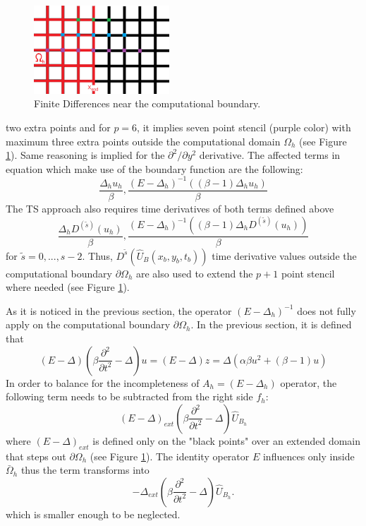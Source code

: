 \documentclass[11pt,a4paper,twoside]{article}
\begin{document}
\begin{figure}[ht]%
\begin{center}
\includegraphics[width=2in]{Pictures/BoundaryPicture.png}
	\caption{Finite Differences near the computational boundary.}
	\label{fig:BoundaryFD}
  \end{center}
\end{figure}
two extra points and for $p=6$, it implies seven point stencil (purple color) with maximum three extra points outside the computational domain $\Omega_h$ (see Figure \ref{fig:BoundaryFD}). Same reasoning is implied for the $\partial^2 / \partial y^2$ derivative. The affected terms in equation  which make use of the boundary function  are the following:
\begin{equation*}
\frac{ \Delta_h u_h}{\beta}, \frac{ (E - \Delta_h)^{-1} ( (\beta -1)\Delta_h u_h) }{\beta}
\end{equation*}
The TS approach also requires time derivatives of both terms defined above
\begin{equation*}
\frac{ \Delta_h D^{(\tilde s)} (u_h)}{\beta}, \frac{ (E - \Delta_h)^{-1} ( (\beta -1)\Delta_h D^{(\tilde s)}(u_h) ) }{\beta}
\end{equation*}
for $\tilde s = 0, ..., s-2$.  Thus, $D^{\tilde s}(\widehat U_B(x_b , y_b, t_b))$  time derivative values outside the computational boundary $\partial \Omega_h$ are also used to extend the $p+1$ point stencil where needed (see Figure  \ref{fig:BoundaryFD}). 

As it is noticed in the previous section, the operator $(E - \Delta_h)^{-1}$ does not fully apply on the computational boundary $\partial \Omega_h$. In the previous section, it is defined that
\begin{equation*}
(E-\Delta)(\beta \frac{ \partial^2 } { \partial t^2 } - \Delta) u = (E-\Delta)z = \Delta ( \alpha \beta u^2  + (\beta -1)u)
\end{equation*}
In order to balance for the incompleteness of $A_h = (E-\Delta_h)$ operator, the following term needs to be subtracted from the right side $f_h$:
\begin{equation*}
(E-\Delta)_{ext}(\beta \frac{ \partial^2 } { \partial t^2 } - \Delta) \widehat U_{B_h}
\end{equation*}
where $(E-\Delta)_{ext}$ is defined only on the "black points" over an extended domain that steps out $\partial \Omega_h$ (see Figure \ref{fig:BoundaryFD}). The identity operator $E$ influences only inside $\bar \Omega_h$ thus the term transforms into
\begin{equation*}
-\Delta_{ext}(\beta \frac{ \partial^2 } { \partial t^2 } - \Delta) \widehat U_{B_h}.
\end{equation*}
which is smaller enough to be neglected.
\end{document}
